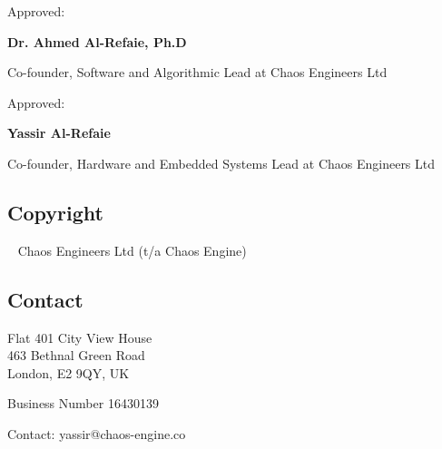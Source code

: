 \documentclass[
	a4paper, %
]{ChaosEngineReport}
\newcommand{\signature}[3]{%
    \vspace{15mm}
    Approved: \hrulefill
    
    \hspace*{0mm}\phantom{Approved: }\textbf{#1}
    
    \hspace*{0mm}\phantom{Approved: }#2 at #3
}
\begin{document}
\signature{Dr. Ahmed Al-Refaie, Ph.D}{Co-founder, Software and Algorithmic Lead}{Chaos Engineers Ltd}

\signature{Yassir Al-Refaie}{Co-founder, Hardware and Embedded Systems Lead}{Chaos Engineers Ltd}



\vfill %
\begingroup
	\footnotesize %
	

	\subsection*{Copyright}
	
	\textcopyright~\the\year{} Chaos Engineers Ltd (t/a Chaos Engine) 
	
	\subsection*{Contact}
	
	Flat 401 City View House\\
	463 Bethnal Green Road\\
	London, E2 9QY, UK
	
	Business Number 16430139
	
	Contact: yassir@chaos-engine.co
\endgroup
\end{document}
